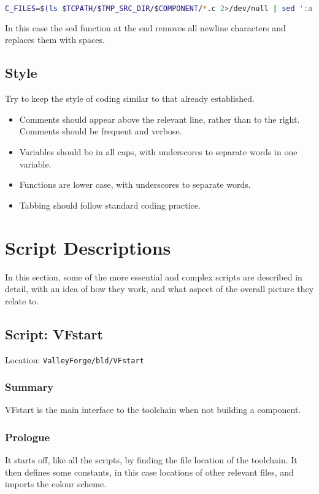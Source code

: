 \documentclass[a4paper, oneside, 11pt, titlepage, onecolumn, openright]{report}
\begin{document}
\begin{lstlisting}[frame=trBL, breaklines=true, language = bash]
C_FILES=$(ls $TCPATH/$TMP_SRC_DIR/$COMPONENT/*.c 2>/dev/null | sed ':a;N;$!ba;s/\n/ /g')
\end{lstlisting}

			In this case the sed function at the end removes all newline characters and replaces them with spaces.

\section{Style}
			\label{s:Style}
			Try to keep the style of coding similar to that already established. 
\begin{itemize}
\item Comments should appear above the relevant line, rather than to the right. Comments should be frequent and verbose.
\item Variables should be in all caps, with underscores to separate words in one variable.
\item Functions are lower case, with underscores to separate words.
\item Tabbing should follow standard coding practice.
\end{itemize}
			

\pagebreak
			
\chapter{Script Descriptions}
			\label{C:ScriptDescriptions}
			In this section, some of the more essential and complex scripts are described in detail, with an idea of how they work, and what aspect of the overall picture they relate to.

\section{Script: VFstart}
			\label{s:VFstart}
			Location: \texttt{ValleyForge/bld/VFstart}
		
\subsection{Summary}
			\label{ss:VFstartSummary}		
			VFstart is the main interface to the toolchain when not building a component.
			
\subsection{Prologue}
			\label{ss:VFstartPrologue}
			It starts off, like all the scripts, by finding the file location of the toolchain. It then defines some constants, in this case locations of other relevant files, and imports the colour scheme.
\end{document}

